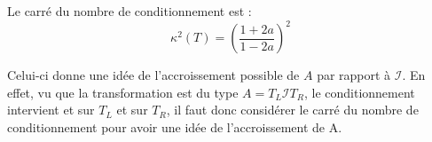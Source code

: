 Le carré du nombre de conditionnement est :
\begin{equation}
	\kappa^2 (T) = (\frac{1+2a}{1-2a})^2
\end{equation}

Celui-ci donne une idée de l'accroissement possible de $A$ par rapport à $\mathcal{I}$. En effet, vu que la transformation est du type $A = T_L \mathcal{I} T_R$, le conditionnement intervient et sur $T_L$ et sur $T_R$, il faut donc considérer le carré du nombre de conditionnement pour avoir une idée de l'accroissement de A. 
 


	

